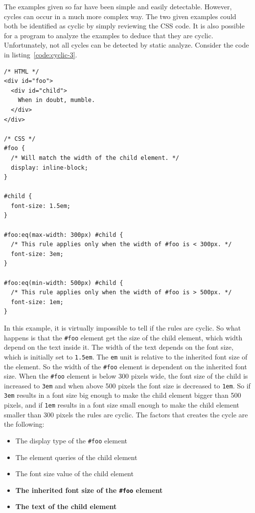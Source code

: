 \documentclass[a4paper,11pt]{kth-mag}
\newcommand{\code}[1]{\texttt{#1}}
\newcommand\abbr[2][]{\uppercase{#2}\ifthenelse{\equal{#1}{}}%
                     {}{#1}}
\begin{document}
          The examples given so far have been simple and easily detectable.
          However, cycles can occur in a much more complex way.
          The two given examples could both be identified as cyclic by simply reviewing the \abbr{css} code.
          It is also possible for a program to analyze the examples to deduce that they are cyclic.
          Unfortunately, not all cycles can be detected by static analyze.
          Consider the code in listing~\ref{code:cyclic-3}.
          \begin{lstlisting}[caption={Example of indirect cyclic rules.}, captionpos=b, label={code:cyclic-3}]
/* HTML */
<div id="foo">
  <div id="child">
    When in doubt, mumble.
  </div>
</div>

/* CSS */
#foo {
  /* Will match the width of the child element. */
  display: inline-block;
}

#child {
  font-size: 1.5em;
}

#foo:eq(max-width: 300px) #child {
  /* This rule applies only when the width of #foo is < 300px. */
  font-size: 3em;
}

#foo:eq(min-width: 500px) #child { 
  /* This rule applies only when the width of #foo is > 500px. */
  font-size: 1em;
}
          \end{lstlisting}
          In this example, it is virtually impossible to tell if the rules are cyclic.
          So what happens is that the \code{\#foo} element get the size of the child element, which width depend on the text inside it.
          The width of the text depends on the font size, which is initially set to \code{1.5em}.
          The \code{em} unit is relative to the inherited font size of the element.
          So the width of the \code{\#foo} element is dependent on the inherited font size.
          When the \code{\#foo} element is below 300 pixels wide, the font size of the child is increased to \code{3em} and when above 500 pixels the font size is decreased to \code{1em}.
          So if \code{3em} results in a font size big enough to make the child element bigger than 500 pixels, and if \code{1em} results in a font size small enough to make the child element smaller than 300 pixels the rules are cyclic.
          The factors that creates the cycle are the following:
          \begin{itemize}
            \item The display type of the \code{\#foo} element
            \item The element queries of the child element
            \item The font size value of the child element
            \item \textbf{The inherited font size of the \code{\#foo} element}
            \item \textbf{The text of the child element}
          \end{itemize}
\end{document}
